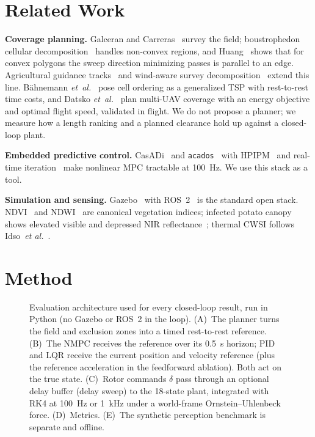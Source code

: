 \documentclass[\PAPERCLASSOPT]{IEEEtran}
\newcommand{\code}[1]{\texttt{\small #1}}
\begin{document}
\section{Related Work}

\textbf{Coverage planning.} Galceran and Carreras~\cite{galceran2013survey}
survey the field; boustrophedon cellular
decomposition~\cite{choset1998boustrophedon} handles non-convex regions, and
Huang~\cite{huang2001optimal} shows that for convex polygons the sweep direction
minimizing passes is parallel to an edge. Agricultural guidance
tracks~\cite{hoffmann2024guidance} and wind-aware survey
decomposition~\cite{coombes2018polygon} extend this line. Bähnemann
\emph{et~al.}~\cite{bahnemann2019gtsp} pose cell ordering as a generalized TSP
with rest-to-rest time costs, and Datsko \emph{et~al.}~\cite{datsko2024energy}
plan multi-UAV coverage with an energy objective and optimal flight speed,
validated in flight. We do not propose a planner; we measure how a length
ranking and a planned clearance hold up against a closed-loop plant.

\textbf{Embedded predictive control.} CasADi~\cite{andersson2019casadi} and
\code{acados}~\cite{verschueren2022acados} with HPIPM~\cite{frison2020hpipm} and
real-time iteration~\cite{diehl2005rti} make nonlinear MPC tractable at 100~Hz.
We use this stack as a tool.

\textbf{Simulation and sensing.} Gazebo~\cite{koenig2004gazebo} with
ROS~2~\cite{macenski2022ros2} is the standard open stack. NDVI~\cite{rouse1974ndvi} and
NDWI~\cite{gao1996ndwi} are canonical vegetation indices; infected potato canopy
shows elevated visible and depressed NIR
reflectance~\cite{franceschini2019lateblight}; thermal CWSI
follows Idso~\emph{et al.}~\cite{idso1981cwsi}.

\section{Method}

\begin{figure}[t]
  \centering
  
  \caption{Evaluation architecture used for every closed-loop result, run in
  Python (no Gazebo or ROS~2 in the loop). (A)~The planner turns the field and
  exclusion zones into a timed rest-to-rest reference. (B)~The NMPC receives
  the reference over its 0.5~s horizon; PID and LQR receive the current
  position and velocity reference (plus the reference acceleration in the
  feedforward ablation). Both act on the true state. (C)~Rotor commands
  $\delta$ pass through an optional delay buffer (delay sweep) to the 18-state
  plant, integrated with RK4 at 100~Hz or 1~kHz under a world-frame
  Ornstein--Uhlenbeck force. (D)~Metrics. (E)~The synthetic perception
  benchmark is separate and offline.}
  \label{fig:arch}
\end{figure}
\end{document}
